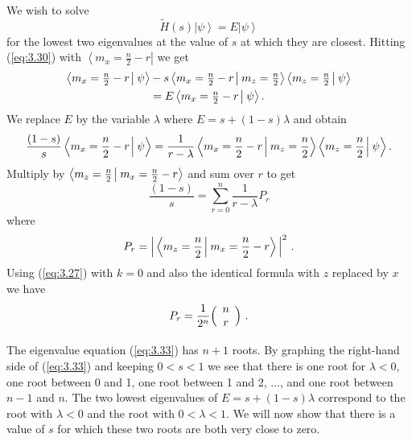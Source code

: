 \documentclass[twoside]{article}
\newcommand{\ket}[1]{\left|#1\right\rangle}
\newcommand{\bra}[1]{\left\langle#1\right|}
\newcommand{\braket}[2]{\left\langle{#1}\mkern-2mu
\mid \mkern-2mu{#2}
\right\rangle}
\newcommand{\braketnew}[2]{\left\langle{#1}\vphantom{#2}
\mkern2mu
 \right| \mkern1mu \left.\mkern-2mu{#2}\vphantom{#1}
\right\rangle}
\let\braket\braketnew
\newcommand{\numEq}[2]{\begin{equation}
   \label{eq:#1}
   #2\end{equation}}
\newcommand{\refEq}[1]{(\ref{eq:#1})}
\newcommand{\fract}[2]{{\textstyle\frac#1#2}}
\let\tilde\widetilde
\numberwithin{equation}{section}
\begin{document}
We wish to solve
\numEq{3.30}{
\tilde H(s) \ket \psi = E\ket\psi } for the lowest two eigenvalues at the
value of $s$ at which they are closest.  Hitting \refEq{3.30} with
$\bra{m_x=\fract{n}{2}-r}$ we get
\begin{gather} [s+(1-s)r] \braketnew{m_x =
\fract{n}{2}-r}{\psi} -s
\braketnew{m_x=\fract{n}{2}-r}{m_z=\fract{n}{2}}\braket{m_z =
\fract{n}{2}}{\psi}\nonumber\\
 =E \braket{m_x = \fract{n}{2}-r}{\psi}  . \label{eq:3.31}
\end{gather} We replace $E$ by the variable $\lambda$ where
$E=s+(1-s) \lambda$ and obtain
\numEq{3.32}{
\frac{(1-s)}{s} \braketnew{m_x = \frac{n}{2}-r}{\psi} 
 = \frac{1}{r-\lambda}
\braketnew{m_x=\frac{n}{2}-r}{m_z=\frac{n}{2}}
\braket{m_z = \frac{n}{2}}{\psi}   .
} 
Multiply by $\braket{m_z=\frac{n}{2}}{m_x=\frac{n}{2}-r}$
and sum over $r$ to get
\numEq{3.33}{
\frac{(1-s)}{s} =\sum^n_{r=0} \frac{1}{r-\lambda} P_r } where
\numEq{3.34}{ P_r = \Big| \braket{m_z=\frac{n}{2}}{m_x=\frac{n}{2}-r}
\Big|^2 \ . }  Using \refEq{3.27} with $k=0$ and also the identical formula
with $z$ replaced by $x$ we have
\numEq{3.35}{ P_r = \frac{1}{2^n} 
\Bigl(\begin{array}{c}n\\r\end{array}\Bigr) \ . }

The eigenvalue equation \refEq{3.33} has $n+1$ roots.  By graphing the
right-hand  side of
\refEq{3.33} and keeping $0<s<1$ we see that there is one root for
$\lambda<0$, one root between 0 and 1, one root between 1 and 2, $\dots$,
and one root between $n-1$ and $n$.  The two lowest eigenvalues of
$E=s+(1-s) \lambda$ correspond to the root with $\lambda<0$ and the root
with $0<\lambda<1$.  We will now show that there is a value of $s$ for
which these two roots are both very close to zero.
\end{document}
